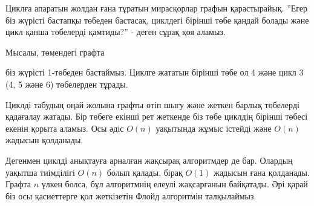 
Циклға апаратын жолдан ғана тұратын мирасқорлар графын қарастырайық.
''Егер біз жүрісті бастапқы төбеден бастасақ, циклдегі бірінші
төбе қандай болады және цикл қанша төбелерді қамтиды?'' - деген сұрақ қоя аламыз. 

Мысалы, төмендегі графта

\begin{center}
\end{center}
біз жүрісті 1-төбеден бастаймыз.
Циклге жататын бірінші төбе ол 4 және цикл 3 (4, 5 және 6)
төбелерден тұрады.

Циклді табудың оңай жолына графты өтіп шығу және жеткен
барлық төбелерді қадағалау жатады. Бір төбеге екінші рет жеткенде
біз төбе циклдің бірінші төбесі екенін қорыта аламыз.
Осы әдіс $O(n)$ уақытында жұмыс істейді және $O(n)$ жадысын қолданады.

Дегенмен циклді анықтауға арналған жақсырақ алгоритмдер де бар.
Олардың уақытша тиімділігі $O(n)$ болып қалады, бірақ
$O(1)$ жадысын ғана қолданады. Графта $n$ үлкен болса, бұл алгоритмнің елеулі жақсарғанын байқатады.
Әрі қарай біз осы қасиеттерге қол жеткізетін Флойд алгоритмін талқылаймыз.

